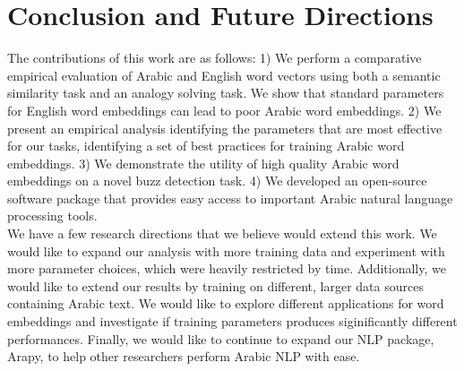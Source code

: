 \chapter{Conclusion and Future Directions}
\label{sec:conclusion}

The contributions of this work are as follows: 1) We perform a comparative empirical evaluation of Arabic and English word vectors using both a semantic similarity task and an analogy solving task. We show that standard parameters for English word embeddings can lead to poor Arabic word embeddings. 2) We present an empirical analysis identifying the parameters that are most effective for our tasks, identifying a set of best practices for training Arabic word embeddings. 3) We demonstrate the utility of high quality Arabic word embeddings on a novel buzz detection task. 4) We developed an open-source software package that provides easy access to important Arabic natural language processing tools. 
\\
We have a few research directions that we believe would extend this work. We would like to expand our analysis with more training data and experiment with more parameter choices, which were heavily restricted by time. Additionally, we would like to extend our results by training on different, larger data sources containing Arabic text. We would like to explore different applications for word embeddings and investigate if training parameters produces siginificantly different performances. Finally, we would like to continue to expand our NLP package, Arapy, to help other researchers perform Arabic NLP with ease.
